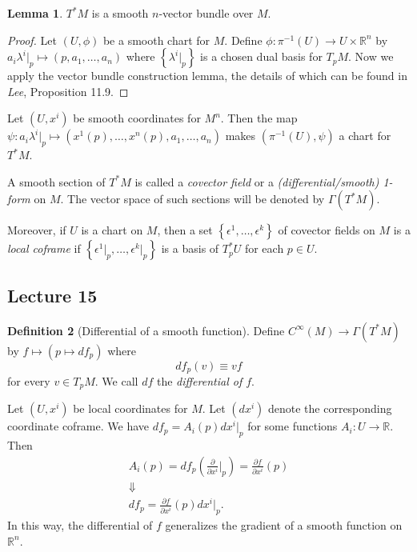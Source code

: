 \documentclass[10pt,letterpaper,cm]{nupset}
\theoremstyle{definition}
\newtheorem{definition}{Definition}[subsection]
\theoremstyle{theorem}
\newtheorem{lemma}[definition]{Lemma}
\theoremstyle{remark}
\newcommand{\R}{\mathbb R}
\newcommand{\1}{\mathbf{1}}
\newcommand{\0}{\vec 0}
\begin{document}
\begin{lemma}
$T^{\ast}M$ is a smooth $n$-vector bundle over $M$.
\end{lemma}
\begin{proof}
Let $\left(U, \phi\right)$ be a smooth chart for $M$. Define $\phi : \pi^{-1}(U) \to U \times \R^n$ by $a_i \lambda^i\bigr\rvert_p \mapsto \left(p, a_1, \ldots, a_n\right)$ where $\left\{\lambda^i \bigr\rvert_p\right\}$ is a chosen dual basis for $T_pM$. Now we apply the vector bundle construction lemma, the details of which can be found in \textit{Lee}, Proposition 11.9.
\end{proof}


Let $(U, x^i)$ be smooth coordinates for $M^n$. Then the map $\psi: a_i\lambda^i\bigr\rvert_p \mapsto \left(x^1(p), \ldots, x^n(p), a_1, \ldots, a_n\right)$ makes  $\left(\pi^{-1}(U), \psi\right)$ a chart for $T^{\ast}M$.

\medskip

A smooth section of $T^{\ast}M$ is called a \textit{covector field} or a \textit{(differential/smooth) 1-form} on $M$. The vector space of such sections will be denoted by $\Gamma(T^{\ast}M)$.

Moreover, if $U$ is a chart on $M$, then a set $\left\{\epsilon^1, \ldots, \epsilon^k\right\}$ of covector fields on $M$ is a \textit{local coframe} if $\left\{\epsilon^1\bigr\rvert_p, \ldots, \epsilon^k\bigr\rvert_p\right\}$ is a basis of $T_p^{\ast}{U}$ for each $p\in U$.



\subsection{Lecture 15}

\begin{definition}[Differential of a smooth function]\label{diff}
Define $C^{\infty}(M) \to \Gamma(T^{\ast}M)$ by $f \mapsto \left(p\mapsto df_p\right)$ where $$df_p(v) \equiv vf$$ for every $v\in T_pM$. We call $df$ the \textit{differential of $f$}.
\end{definition}


Let $\left(U, x^i\right)$ be local coordinates for $M$. Let $\left(dx^i\right)$ denote the corresponding coordinate coframe. We have $df_p = A_i(p)dx^i\bigr\rvert_p$ for some functions $A_i : U \to \R$. Then 
\begin{gather*}
A_i(p) = df_p\left(\frac{\partial}{\partial{x^i}}\bigr\rvert_p\right) = \frac{\partial{f}}{\partial{x^i}}(p)
\\ \Downarrow
\\ df_p = \frac{\partial{f}}{\partial{x^i}}(p) dx^i\bigr\rvert_p.
\end{gather*} In this way, the differential of $f$ generalizes the gradient of a smooth function on $\R^n$.
\end{document}
